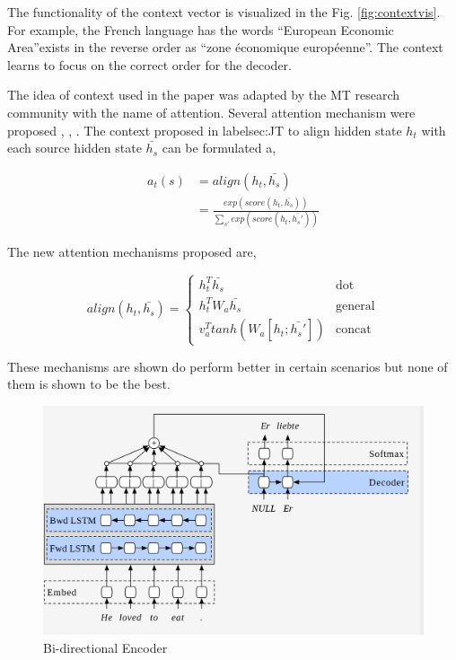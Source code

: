 \documentclass[a4paper]{article}
\begin{document}
The  functionality   of   the   context  vector  is   visualized  in   the  Fig.
\ref{fig:contextvis}.  For   example,  the   French  language   has  the   words
\textquotedblleft European Economic Area\textquotedblright exists in the reverse
order as \textquotedblleft zone \'{e}conomique europ\'{e}enne\textquotedblright.
The context learns to focus on the correct order for the decoder.


The  idea of context  used in the paper was adapted by the MT research community
with   the  name   of  attention.  Several  attention  mechanism  were  proposed
\cite{luong2015effective},  \cite{cho2014learning},  \cite{gregor2015draw}.  The
context proposed in  label{sec:JT} to align hidden state  $h_t$ with each source
hidden state $\bar{h_s}$ can be formulated a,


\begin{equation}
  \begin{split}
    a_t(s) & = align(h_t,\bar{h_s}) \\
    & = \frac{exp(score(h_t,\bar{h_s}))}{\sum_{s'} exp(score(h_t,\bar{h_s'}))}
  \end{split}
\end{equation}


The new attention mechanisms proposed are,


\begin{equation*}
  align(h_t,\bar{h_s}) = \begin{cases}
    h_t^T\bar{h_s} & \text{dot} \\
    h_t^TW_a\bar{h_s} & \text{general} \\
    v_a^T tanh (W_a[h_t;\bar{h_s'}]) & \text{concat}
  \end{cases}
\end{equation*}


These mechanisms  are shown  do perform better  in certain scenarios but none of
them is shown to be the best.


\begin{figure}
  \includegraphics[width=0.9\linewidth]{img/birnn.png}
  \caption{Bi-directional Encoder}
  \label{fig:birnn}
\end{figure}
\end{document}
